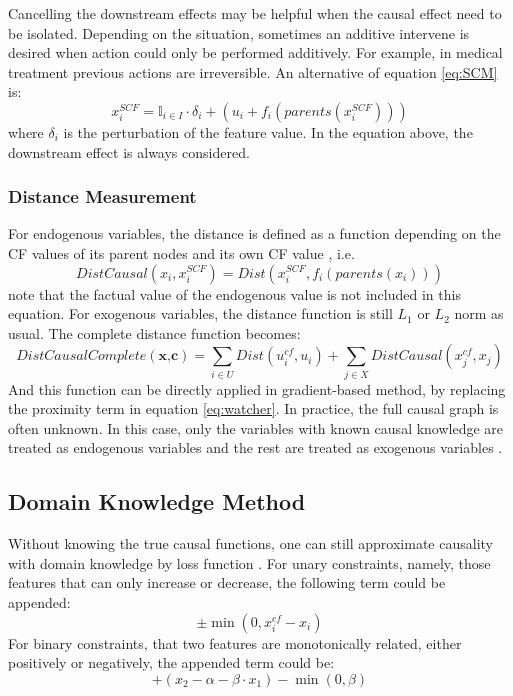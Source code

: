 Cancelling the downstream effects may be helpful when the causal effect need to be isolated. Depending on the situation, sometimes an additive intervene is desired when action could only be performed additively. For example, in medical treatment previous actions are irreversible. An alternative of equation \ref{eq:SCM} is:
\begin{equation}\label{eq:SCMsoft}
  x_i^{SCF}=\mathbb{I}_{i\in I}\cdot \delta_i+(u_i+f_i(parents(x_i^{SCF})))
\end{equation}
where $\delta_i$ is the perturbation of the feature value. In the equation above, the downstream effect is always considered.

\subsubsection{Distance Measurement} For endogenous variables, the distance is defined as a function depending on the CF values of its parent nodes and its own CF value \cite{preservingCausal}, i.e.
\begin{equation}\label{eq:CausalDist}
  DistCausal(x_i,x_i^{SCF})=Dist(x_i^{SCF},f_i(parents(x_i)))
\end{equation}
note that the factual value of the endogenous value is not included in this equation. For exogenous variables, the distance function is still $L_1$ or $L_2$ norm as usual. The complete distance function becomes:
\begin{equation}\label{eq:CausalDistComplete}
  DistCausalComplete(\textbf{x,c})=\sum_{i\in U}Dist(u_i^{cf},u_i)+\sum_{j\in X}DistCausal(x_j^{cf},x_j)
\end{equation}
And this function can be directly applied in gradient-based method, by replacing the proximity term in equation \ref{eq:watcher}. In practice, the full causal graph is often unknown. In this case, only the variables with known causal knowledge are treated as endogenous variables and the rest are treated as exogenous variables \cite{preservingCausal}.

\subsection{Domain Knowledge Method}
Without knowing the true causal functions, one can still approximate causality with domain knowledge by loss function \cite{preservingCausal}. For unary constraints, namely, those features that can only increase or decrease, the following term could be appended:
\begin{equation}\label{eq:approxUnary}
  \pm \min(0,x_i^{cf}-x_i)
\end{equation}
For binary constraints, that two features are monotonically related, either positively or negatively, the appended term could be:
\begin{equation}\label{eq:approxBi}
  +(x_2-\alpha-\beta\cdot x_1)-\min(0,\beta)
\end{equation}
